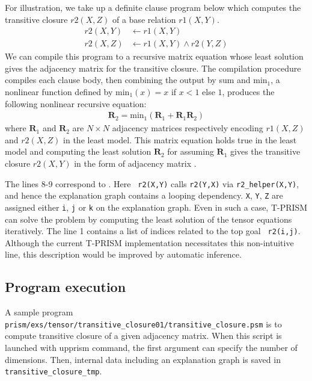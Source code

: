\documentclass[a4paper]{report}
\newcommand{\mmat}[1]{\mathbf{#1}}
\newcommand{\minx}{\mbox{min}_1}
\begin{document}
For illustration,  we take  up a definite  clause program  below which
computes  the   transitive  closure  $r2(X,Z)$  of   a  base  relation
$r1(X,Y)$.
%
\begin{align}\nonumber
r2(X,Y) & \leftarrow r1(X,Y) \\
r2(X,Z) & \leftarrow r1(X,Y) \wedge r2(Y,Z)
\label{eq:trnsitive}
\end{align}
%
We can compile this program to a recursive matrix equation whose least
solution gives the  adjacency matrix for the  transitive closure.  The
compilation procedure  compiles each  clause body, then  combining the
output by sum and $\minx$, a nonlinear function defined by $\minx(x) =
x$ if  $x < 1$  else $1$,  produces the following  nonlinear recursive
equation:
%
\begin{eqnarray}
\mmat{R}_2 = \minx(\mmat{R}_1+\mmat{R}_1\mmat{R}_2)
\label{eq:tr}
\end{eqnarray}
%
where  $\mmat{R}_1$  and  $\mmat{R}_2$  are  $N  \times  N$  adjacency
matrices respectively  encoding $r1(X,Z)$  and $r2(X,Z)$ in  the least
model.   This  matrix equation  holds  true  in  the least  model  and
computing  the  least   solution  $\mmat{R}_2$  for  
assuming $\mmat{R}_1$  gives the  transitive closure $r2(X,Y)$  in the
form of adjacency matrix \cite{sato2017linear}.

The  lines  8-9  correspond to  .   Here  {\tt
	r2(X,Y)} calls {\tt r2(Y,X)} via  {\tt r2\_helper(X,Y)}, and hence the
explanation graph  contains a looping  dependency.  {\tt X},  {\tt Y},
{\tt  Z} are  assigned either  {\tt  i}, {\tt  j}  or {\tt  k} on  the
explanation graph.  Even in such a case, T-PRISM can solve the problem
by computing the  least solution of the  tensor equations iteratively.
The line  1 contains a  list of indices related  to the top  goal {\tt
	r2(i,j)}.   Although the  current  T-PRISM implementation  necessitates
this  non-intuitive  line,  this  description  would  be  improved  by
automatic inference.

\subsection*{Program execution}

A sample program {\tt prism/exs/tensor/transitive\_closure01/transitive\_closure.psm} is to compute transitive closure of a given adjacency matrix.
When this script is launched with upprism command, the first argument can specify the  number of dimensions.
Then, internal data including an explanation graph is saved in {\tt transitive\_closure\_tmp}.
\end{document}
